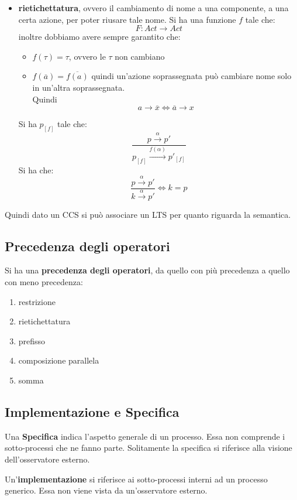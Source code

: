 \begin{itemize}
\begin{nota}
        \end{nota}
  \item \textbf{rietichettatura}, ovvero il cambiamento di nome a una
  componente, a una certa azione, per poter riusare tale nome. Si ha una
  funzione $f$ tale che:
  \[F:Act\to Act\]
  inoltre dobbiamo avere sempre garantito che:
  \begin{itemize}
    \item $f(\tau)=\tau$, ovvero le $\tau$ non cambiano
    \item $f(\overline{a})=\overline{f(a)}$ quindi un'azione soprassegnata può
    cambiare nome solo in un'altra soprassegnata. \\ Quindi \[a\to \overline{x} \iff \overline{a}\to x\]
  \end{itemize}
  Si ha $p_{[f]}$ tale che:
  \[\frac{p\stackrel{\alpha}{\rightarrow}p'}{p_{[f]}
      \stackrel{f(\alpha)}{\rightarrow}p'_{[f]}}\]
  Si ha che:
  \[\frac{p\stackrel{\alpha}{\rightarrow}p'}{k
      \stackrel{\alpha}{\rightarrow}p'}\iff k=p\]
\end{itemize}
Quindi dato un CCS si può associare un LTS per quanto riguarda la semantica.\\
\subsection{Precedenza degli operatori}
Si ha una \textbf{precedenza degli operatori}, da quello con più precedenza a
quello con meno precedenza: 
\begin{enumerate}
  \item restrizione
  \item rietichettatura
  \item prefisso
  \item composizione parallela
  \item somma
\end{enumerate}
\subsection{Implementazione e Specifica}
\begin{definizione}
  Una \textbf{Specifica} indica l'aspetto generale di un processo. Essa non comprende i sotto-processi che ne fanno parte. Solitamente la specifica si riferisce alla visione dell'osservatore esterno.
\end{definizione} \vspace{5mm} %
\begin{definizione}
  Un'\textbf{implementazione} si riferisce ai sotto-processi interni ad un processo generico. Essa non viene vista da un'osservatore esterno.
\end{definizione} \vspace{5mm} %
